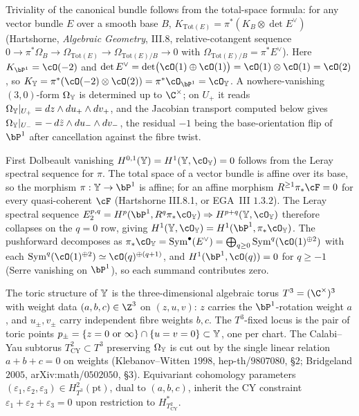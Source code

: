 Triviality of the canonical bundle follows from the total-space formula: for any vector bundle $E$ over a smooth base $B$, $K_{\mathrm{Tot}(E)} = \pi^*(K_B \otimes \det E^\vee)$ (Hartshorne, \emph{Algebraic Geometry}, III.8, relative-cotangent sequence $0 \to \pi^* \Omega_B \to \Omega_{\mathrm{Tot}(E)} \to \Omega_{\mathrm{Tot}(E)/B} \to 0$ with $\Omega_{\mathrm{Tot}(E)/B} = \pi^* E^\vee$). Here $K_{\bP^1} = \cO(-2)$ and $\det E^\vee = \det\bigl(\cO(1) \oplus \cO(1)\bigr) = \cO(1) \otimes \cO(1) = \cO(2)$, so $K_\bY = \pi^*(\cO(-2) \otimes \cO(2)) = \pi^* \cO_{\bP^1} = \cO_\bY$. A nowhere-vanishing $(3,0)$-form $\Omega_{\mathbb{Y}}$ is determined up to $\C^\times$; on $U_+$ it reads $\Omega_{\mathbb{Y}}|_{U_+} = dz \wedge du_+ \wedge dv_+$, and the Jacobian transport computed below gives $\Omega_{\mathbb{Y}}|_{U_-} = -\,d\tilde z \wedge du_- \wedge dv_-$, the residual $-1$ being the base-orientation flip of $\bP^1$ after cancellation against the fibre twist.

First Dolbeault vanishing $H^{0,1}(\bY) = H^1(\bY, \cO_\bY) = 0$ follows from the Leray spectral sequence for $\pi$. The total space of a vector bundle is affine over its base, so the morphism $\pi : \bY \to \bP^1$ is affine; for an affine morphism $R^{\geq 1}\pi_* \cF = 0$ for every quasi-coherent $\cF$ (Hartshorne III.8.1, or EGA~III $1.3.2$). The Leray spectral sequence $E_2^{p,q} = H^p(\bP^1, R^q \pi_* \cO_\bY) \Rightarrow H^{p+q}(\bY, \cO_\bY)$ therefore collapses on the $q = 0$ row, giving $H^1(\bY, \cO_\bY) = H^1(\bP^1, \pi_* \cO_\bY)$. The pushforward decomposes as $\pi_* \cO_\bY = \mathrm{Sym}^\bullet(E^\vee) = \bigoplus_{q \geq 0} \mathrm{Sym}^q(\cO(1)^{\oplus 2})$ with each $\mathrm{Sym}^q(\cO(1)^{\oplus 2}) \simeq \cO(q)^{\oplus(q+1)}$, and $H^1(\bP^1, \cO(q)) = 0$ for $q \geq -1$ (Serre vanishing on $\bP^1$), so each summand contributes zero.

The toric structure of $\mathbb{Y}$ is the three-dimensional algebraic torus $T^3 = (\C^\times)^3$ with weight data $(a, b, c) \in \Z^3$ on $(z, u, v)$: $z$ carries the $\bP^1$-rotation weight $a$, and $u_\pm, v_\pm$ carry independent fibre weights $b, c$. The $T^3$-fixed locus is the pair of toric points $p_\pm = \{z = 0\text{ or }\infty\} \cap \{u = v = 0\} \subset \mathbb{Y}$, one per chart. The Calabi--Yau subtorus $T^2_{\mathrm{CY}} \subset T^3$ preserving $\Omega_{\mathbb{Y}}$ is cut out by the single linear relation $a + b + c = 0$ on weights (Klebanov--Witten $1998$, hep-th/$9807080$, \S$2$; Bridgeland $2005$, arXiv:math/$0502050$, \S$3$). Equivariant cohomology parameters $(\varepsilon_1, \varepsilon_2, \varepsilon_3) \in H^2_{T^3}(\mathrm{pt})$, dual to $(a, b, c)$, inherit the CY constraint $\varepsilon_1 + \varepsilon_2 + \varepsilon_3 = 0$ upon restriction to $H^*_{T^2_{\mathrm{CY}}}$.


